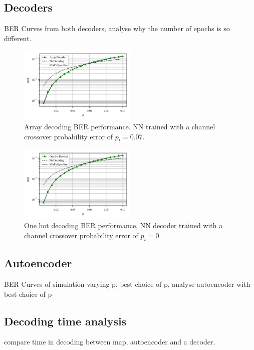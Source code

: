 \documentclass[conference]{IEEEtran}
\begin{document}
\subsection{Decoders}
BER Curves from both decoders, analyse why the number of epochs is so different. 

\begin{figure}[!ht]
  \centering
    \includegraphics[width=0.5\textwidth]{images/MLNN_Mep_65536_ptrain_007}
    \caption{Array decoding BER performance. NN trained with a channel crossover probability error of $p_t=0.07$.}\label{fig:ArrayD}
\end{figure}

\begin{figure}[!ht]
  \centering
    \includegraphics[width=0.5\textwidth]{images/MLNN1H_Mep_16384_ptrain_0}
    \caption{One hot decoding BER performance. NN decoder trained with a channel crossover probability error of $p_t=0$.}\label{fig:1HD}
\end{figure}


\subsection{Autoencoder}
BER Curves of simulation varying p, best choice of p, analyse autoencoder with best choice of p


\subsection{Decoding time analysis}
compare time in decoding between map, autoencoder and a decoder.
\end{document}
